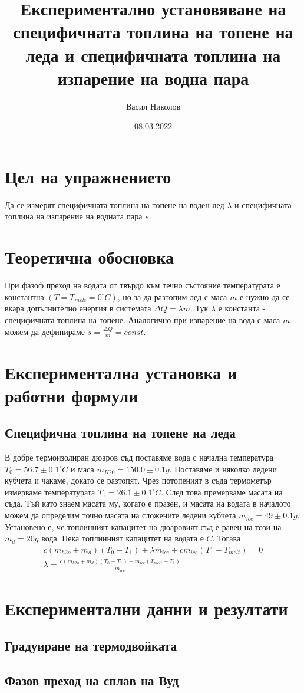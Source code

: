 \documentclass[%
 reprint,
 amsmath,amssymb,
 aps,
]{revtex4-2}
\begin{document}

\title{Експериментално установяване на специфичната топлина на топене на леда и специфичната топлина на изпарение на водна пара}
\author{Васил Николов}
\date{08.03.2022}
\maketitle

\section{Цел на упражнението}
Да се измерят специфичната топлина на топене на воден лед $\lambda$ и специфичната топлина на изпарение на водната пара $s$. 

\section{Теоретична обосновка}

При фазоф преход на водата от твърдо към течно състояние температурата е константна $(T = T_{melt} = 0^{\circ}C)$, но за да разтопим лед с маса $m$ е нужно да се вкара допълнително енергия в системата $\Delta Q = \lambda m$. Тук $\lambda$ е константа - специфичната топлина на топене. Аналогично при изпарение на вода с маса $m$ можем да дефинираме $s = \frac{\Delta Q}{m} = const$. 

\section{Експериментална установка и работни формули}

\subsection{Специфична топлина на топене на леда}
В добре термоизолиран дюаров съд поставяме вода с начална температура $T_0 = 56.7 \pm 0.1 ^{\circ}C $ и маса $m_{H20} = 150.0 \pm 0.1 g$. Поставяме и няколко ледени кубчета и чакаме, докато се разтопят. Чрез потопеният в съда термометър измерваме температурата $T_1 = 26.1 \pm 0.1 ^{\circ}C $. След това премерваме масата на съда. Тъй като знаем масата му, когато е празен, и масата на водата в началото можем да определим точно масата на сложените ледени кубчета $m_{ice} = 49 \pm 0.1 g$. Установено е, че топлинният капацитет на дюаровият съд е равен на този на $m_d = 20g$ вода. Нека топлинният капацитет на водата е $C$. Тогава
\begin{gather*}
    c(m_{h2o} + m_d)(T_0 - T_1) + \lambda m_{ice} + c m_{ice} (T_1 - T_{melt}) = 0 \\
    \lambda = \frac{c(m_{h2o} + m_d)(T_0 - T_1) + m_{ice}(T_{melt} - T_1)}{m_{ice}}
\end{gather*}

\section{Експериментални данни и резултати}

\subsection{Градуиране на термодвойката}

\subsection{Фазов преход на сплав на Вуд}
\end{document}
